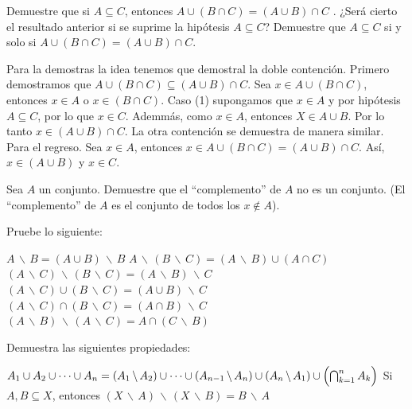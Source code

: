 \documentclass[fc]{tarea}
\newcommand{\menos}{\, \backslash \,}
\begin{document}
\begin{exercise}
    \begin{tasks}
        \task Demuestre que si $A \subseteq C$, entonces $A \cup (B \cap C) = (A \cup B) \cap C$ .
        \task ¿Será cierto el resultado anterior si se suprime la hipótesis $A \subseteq C$?
        \task Demuestre que $A \subseteq C$ si y solo si $A \cup (B \cap C) = (A \cup B) \cap C$.
    \end{tasks}
\end{exercise}

\begin{solution}
    Para la demostras la idea tenemos que demostral la doble contención. Primero demostramos que $A \cup (B \cap C) \subseteq (A \cup B) \cap C$.
    Sea $x \in A \cup (B \cap C)$, entonces $x \in A$ o $x \in (B \cap C)$. Caso (1) supongamos que $x \in A$ y por hipótesis
    $A \subseteq C$, por lo que $x \in C$. Ademmás, como $x \in A$, entonces $X \in A \cup B$. Por lo tanto $ x \in (A \cup B)
    \cap C$. La otra contención se demuestra de manera similar.
    Para el regreso. Sea $x \in A$, entonces $x \in A \cup (B \cap C) = (A \cup B) \cap C$. Así, $x \in (A \cup B)$
    y $x \in C$.
\end{solution}

\begin{exercise}
    Sea $A$ un conjunto. Demuestre que el ``complemento'' de $A$ no es un conjunto. (El ``complemento'' de $A$ es el conjunto de todos los $x \not\in A$).
\end{exercise}

\begin{exercise}
    Pruebe lo siguiente:
\begin{tasks}
    \task $A \menos B = (A \cup B) \menos B$
    \task $A \menos (B \menos C) = (A \menos B) \cup (A \cap C)$
    \task $(A \menos C) \menos (B \menos C) = (A \menos B) \menos C$
    \task $(A \menos C) \cup (B \menos C) = (A \cup B) \menos C$
    \task $(A \menos C) \cap (B \menos C) = (A \cap B) \menos C$
    \task $(A \menos B) \menos (A \menos C) = A \cap (C \menos B)$
\end{tasks}
\end{exercise}

\begin{exercise}
    Demuestra las siguientes propiedades:
    \begin{tasks}
    \task $A_1 \cup A_2 \cup \dots \cup A_n = (A_1 \menos A_2) \cup \dots \cup (A_{n-1} \menos A_n) \cup (A_n \menos A_1) \cup \Bigl( \bigcap_{k=1}^n A_k \Bigr)$
    \task Si $A, B \subseteq X$, entonces $(X \menos A) \menos (X \menos B) = B \menos A$
\end{tasks}
\end{exercise}
\end{document}
